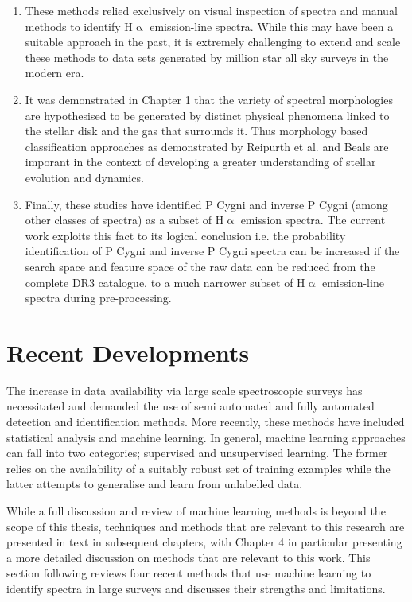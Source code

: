 \begin{enumerate}
\item These methods relied exclusively on visual inspection of spectra and manual methods to identify H$\upalpha$ emission-line spectra. While this may have been a suitable approach in the past, it is extremely challenging to extend and scale these methods to data sets generated by million star all sky surveys in the modern era.

\item It was demonstrated in Chapter 1 that the variety of spectral morphologies are hypothesised to be generated by distinct physical phenomena linked to the stellar disk and the gas that surrounds it. Thus morphology based classification approaches as demonstrated by Reipurth et al. and Beals are imporant in the context of developing a greater understanding of stellar evolution and dynamics.

\item Finally, these studies have identified P Cygni and inverse P Cygni (among other classes of spectra) as a subset of H$\upalpha$ emission spectra. The current work exploits this fact to its logical conclusion i.e. the probability identification of P Cygni and inverse P Cygni spectra can be increased if the search space and feature space of the raw data can be reduced from the complete DR3 catalogue, to a much narrower subset of H$\upalpha$ emission-line spectra during pre-processing. 
\end{enumerate}

\section{Recent Developments}

The increase in data availability via large scale spectroscopic surveys has necessitated and demanded the use of semi automated and fully automated detection and identification methods. More recently, these methods have included statistical analysis and machine learning. In general, machine learning approaches can fall into two categories; supervised and unsupervised learning. The former relies on the availability of a suitably robust set of training examples while the latter attempts to generalise and learn from unlabelled data\cite{hastie2009elements}. 

While a full discussion and review of machine learning methods is beyond the scope of this thesis, techniques and methods that are relevant to this research are presented in text in subsequent chapters, with Chapter 4 in particular presenting a more detailed discussion on methods that are relevant to this work. This section following reviews four recent methods that use machine learning to identify spectra in large surveys and discusses their strengths and limitations.

